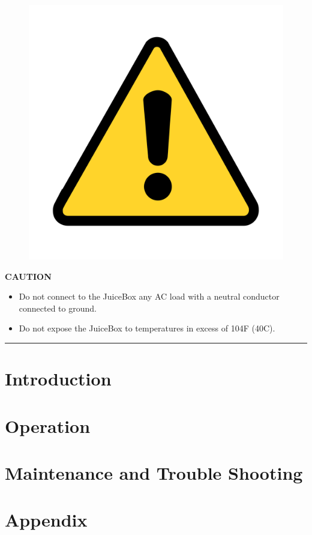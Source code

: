 \documentclass[10pt]{article}
\begin{document}
\begin{figure}
    \includegraphics[width=.75in]{warning_y}
\end{figure}

\vspace{5mm}
\noindent   
\Large{\textbf{CAUTION}} \\
\begin{large}                                        
	\begin{itemize}
		\item{Do not connect to the JuiceBox any AC load with a neutral conductor connected to ground.}
		\item{Do not expose the JuiceBox to temperatures in excess of 104F (40C).}
	\end{itemize}
\end{large}
\hrule


\newpage
\tableofcontents

\newpage
{} 					%
\setcounter{page}{1} 					%

\newpage
\section{\huge{Introduction}}

 
\newpage
\section{\huge{Operation}}


\newpage
\section{\huge{Maintenance and Trouble Shooting}}



\newpage
\section{\huge{Appendix}}

\end{document}

